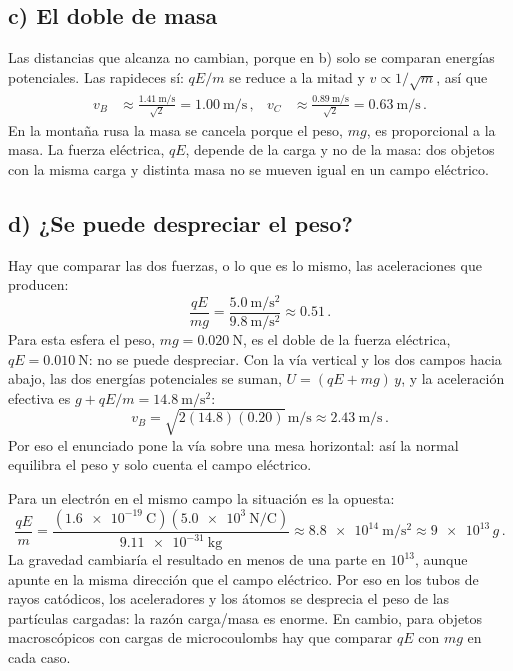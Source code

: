 \documentclass[11pt,a4paper]{book}
\begin{document}
\subsection*{c) El doble de masa}
Las distancias que alcanza no cambian, porque en b) solo se comparan energías potenciales. Las rapideces sí: $qE/m$ se reduce a la mitad y $v \propto 1/\sqrt{m}$, así que
\begin{align}
    v_B &\approx \frac{\SI{1.41}{\meter\per\second}}{\sqrt{2}} = \SI{1.00}{\meter\per\second}\,, &
    v_C &\approx \frac{\SI{0.89}{\meter\per\second}}{\sqrt{2}} = \SI{0.63}{\meter\per\second}\,.
\end{align}
En la montaña rusa la masa se cancela porque el peso, $mg$, es proporcional a la masa. La fuerza eléctrica, $qE$, depende de la carga y no de la masa: dos objetos con la misma carga y distinta masa no se mueven igual en un campo eléctrico.

\subsection*{d) ¿Se puede despreciar el peso?}
Hay que comparar las dos fuerzas, o lo que es lo mismo, las aceleraciones que producen:
\begin{equation}
    \frac{qE}{mg} = \frac{\SI{5.0}{\meter\per\second\squared}}{\SI{9.8}{\meter\per\second\squared}} \approx 0.51\,.
\end{equation}
Para esta esfera el peso, $mg = \SI{0.020}{\newton}$, es el doble de la fuerza eléctrica, $qE = \SI{0.010}{\newton}$: no se puede despreciar. Con la vía vertical y los dos campos hacia abajo, las dos energías potenciales se suman, $U = (qE + mg)\,y$, y la aceleración efectiva es $g + qE/m = \SI{14.8}{\meter\per\second\squared}$:
\begin{equation}
    v_B = \sqrt{2(14.8)(0.20)}\,\si{\meter\per\second} \approx \SI{2.43}{\meter\per\second}\,.
\end{equation}
Por eso el enunciado pone la vía sobre una mesa horizontal: así la normal equilibra el peso y solo cuenta el campo eléctrico.

Para un electrón en el mismo campo la situación es la opuesta:
\begin{equation}
    \frac{qE}{m} = \frac{(\SI{1.6e-19}{\coulomb})(\SI{5.0e3}{\newton\per\coulomb})}{\SI{9.11e-31}{\kilogram}} \approx \SI{8.8e14}{\meter\per\second\squared} \approx \num{9e13}\,g\,.
\end{equation}
La gravedad cambiaría el resultado en menos de una parte en $10^{13}$, aunque apunte en la misma dirección que el campo eléctrico. Por eso en los tubos de rayos catódicos, los aceleradores y los átomos se desprecia el peso de las partículas cargadas: la razón carga/masa es enorme. En cambio, para objetos macroscópicos con cargas de microcoulombs hay que comparar $qE$ con $mg$ en cada caso.
\end{document}
